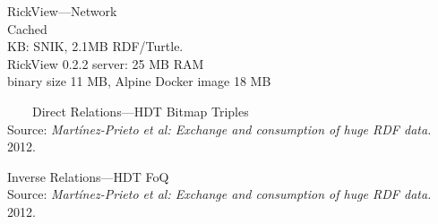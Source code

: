 \documentclass[14pt,aspectratio=169]{beamer}
\newcommand{\imageslide}[4][]
{
\begin{frame}[plain]{~~~~#2}
\vspace{0.2em}
\centering\makebox[\linewidth]{\texttt{[image: \#3]}}
\\#1
\note{#4}
\end{frame}
}
\begin{document}
\begin{frame}[plain]{RickView---Network}
\centering
{}\\
\pause
Cached\\
\centering{}
KB: SNIK, 2.1MB RDF/Turtle.\\
RickView 0.2.2 server: 25 MB RAM\\
binary size 11 MB, Alpine Docker image 18 MB
\end{frame}

\imageslide[\footnotesize Source: \emph{Martínez-Prieto et al: Exchange and consumption of huge RDF data.} 2012.]{Direct Relations---HDT Bitmap Triples}{img/bt.png}{}

\begin{frame}[plain]{Inverse Relations---HDT FoQ}
\centering
{}\\
\footnotesize Source: \emph{Martínez-Prieto et al: Exchange and consumption of huge RDF data.} 2012.
\end{frame}
\end{document}
